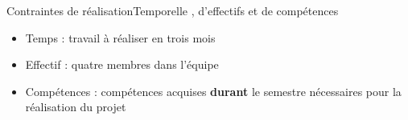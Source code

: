 \begin{frame}{Contraintes de réalisation}{Temporelle , d'effectifs et de
compétences}
\begin{itemize}
  \item Temps : travail à réaliser en trois mois
  \item Effectif : quatre membres dans l'équipe
  \item Compétences : compétences acquises \textbf {durant} le semestre nécessaires pour la réalisation du projet
\end{itemize}
\end{frame}
